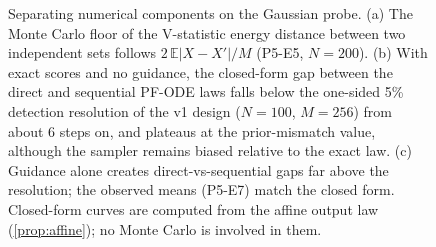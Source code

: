 \begin{figure}[t]
\begin{minipage}[t]{0.32\textwidth}
\end{minipage}\hfill
\begin{minipage}[t]{0.32\textwidth}
\end{minipage}
\caption{Separating numerical components on the Gaussian probe. (a) The Monte Carlo floor of the V-statistic energy distance between two independent sets follows $2\,\mathbb{E}|X-X'|/M$ (P5-E5, $N=200$). (b) With exact scores and no guidance, the closed-form gap between the direct and sequential PF-ODE laws falls below the one-sided 5\% detection resolution of the v1 design ($N=100$, $M=256$) from about 6 steps on, and plateaus at the prior-mismatch value, although the sampler remains biased relative to the exact law. (c) Guidance alone creates direct-vs-sequential gaps far above the resolution; the observed means (P5-E7) match the closed form. Closed-form curves are computed from the affine output law (\cref{prop:affine}); no Monte Carlo is involved in them.}
\label{fig:numerics}
\end{figure}
